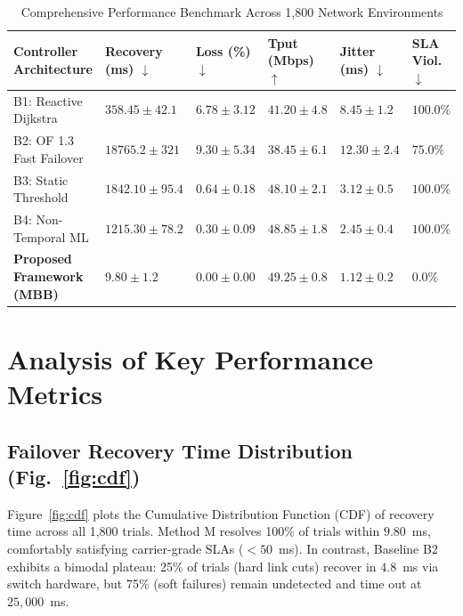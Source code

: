 \documentclass[11pt,a4paper]{report}
\begin{document}
\begin{table}[htbp]
\centering
\caption{Comprehensive Performance Benchmark Across 1,800 Network Environments}
\label{tab:main_results}
\small
\setlength{\tabcolsep}{3.5pt}
\begin{tabularx}{\linewidth}{@{} p{4.2cm} >{\centering\arraybackslash}p{2.8cm} >{\centering\arraybackslash}X >{\centering\arraybackslash}X >{\centering\arraybackslash}X >{\centering\arraybackslash}X @{}}
\toprule
\textbf{Controller Architecture} & \textbf{Recovery (ms)} $\downarrow$ & \textbf{Loss (\%)} $\downarrow$ & \textbf{Tput (Mbps)} $\uparrow$ & \textbf{Jitter (ms)} $\downarrow$ & \textbf{SLA Viol.} $\downarrow$ \\
\midrule
B1: Reactive Dijkstra            & $358.45 \pm 42.1$ & $6.78 \pm 3.12$ & $41.20 \pm 4.8$ & $8.45 \pm 1.2$ & $100.0\%$ \\
B2: OF 1.3 Fast Failover         & $18765.2 \pm 321$ & $9.30 \pm 5.34$ & $38.45 \pm 6.1$ & $12.30 \pm 2.4$& $75.0\%$ \\
B3: Static Threshold             & $1842.10 \pm 95.4$& $0.64 \pm 0.18$ & $48.10 \pm 2.1$ & $3.12 \pm 0.5$ & $100.0\%$ \\
B4: Non-Temporal ML              & $1215.30 \pm 78.2$& $0.30 \pm 0.09$ & $48.85 \pm 1.8$ & $2.45 \pm 0.4$ & $100.0\%$ \\
\midrule
\textbf{Proposed Framework (MBB)} & $\mathbf{9.80 \pm 1.2}$ & $\mathbf{0.00 \pm 0.00}$ & $\mathbf{49.25 \pm 0.8}$ & $\mathbf{1.12 \pm 0.2}$ & $\mathbf{0.0\%}$ \\
\bottomrule
\end{tabularx}
\end{table}

\section{Analysis of Key Performance Metrics}

\subsection{Failover Recovery Time Distribution (Fig.~\ref{fig:cdf})}
Figure~\ref{fig:cdf} plots the Cumulative Distribution Function (CDF) of recovery time across all 1,800 trials. Method M resolves 100\% of trials within $9.80$~ms, comfortably satisfying carrier-grade SLAs ($< 50$~ms). In contrast, Baseline B2 exhibits a bimodal plateau: 25\% of trials (hard link cuts) recover in $4.8$~ms via switch hardware, but 75\% (soft failures) remain undetected and time out at $25,000$~ms.
\end{document}
